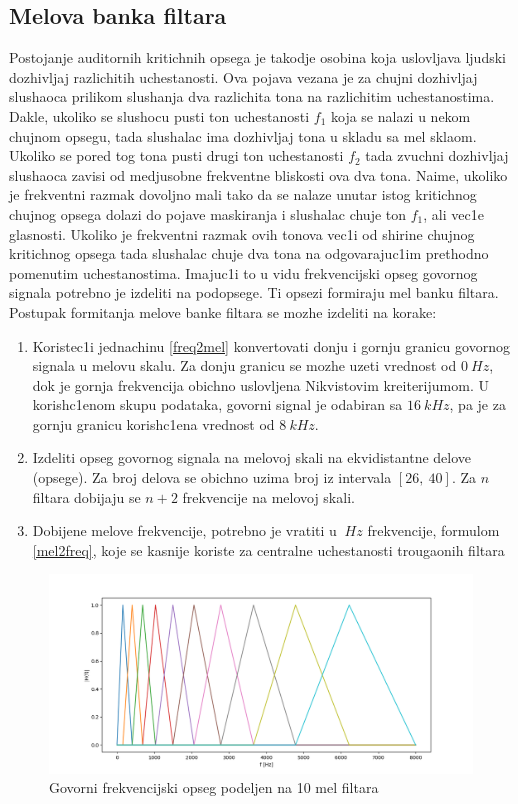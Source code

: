\documentclass[a4paper, openany, oneside, 11pt]{book}
\begin{document}
\subsection{Melova banka filtara}
Postojanje auditornih kritichnih opsega je takodje osobina koja uslovljava ljudski dozhivljaj razlichitih uchestanosti. Ova pojava vezana je za chujni dozhivljaj slushaoca  prilikom slushanja dva razlichita tona na razlichitim uchestanostima. Dakle, ukoliko se slushocu pusti ton uchestanosti $f_1$ koja se nalazi u nekom chujnom opsegu, tada slushalac ima dozhivljaj tona u skladu sa mel sklaom. Ukoliko se pored tog tona pusti drugi ton uchestanosti $f_2$ tada zvuchni dozhivljaj slushaoca zavisi od medjusobne frekventne bliskosti ova dva tona. Naime, ukoliko je frekventni razmak dovoljno mali tako da se nalaze unutar istog kritichnog chujnog opsega dolazi do pojave maskiranja i slushalac chuje ton $f_1$, ali vec1e glasnosti. Ukoliko je frekventni razmak ovih tonova vec1i od shirine chujnog kritichnog opsega tada slushalac chuje dva tona na odgovarajuc1im prethodno pomenutim uchestanostima. Imajuc1i to u vidu frekvencijski opseg govornog signala potrebno je izdeliti na podopsege. Ti opsezi formiraju mel banku filtara. Postupak formitanja melove banke filtara se mozhe izdeliti na korake:
\begin{enumerate}
\item Koristec1i jednachinu \ref{freq2mel} konvertovati donju i gornju granicu govornog signala u melovu skalu. Za donju granicu se mozhe uzeti vrednost od $\SI{0}{Hz}$, dok je gornja frekvencija obichno uslovljena Nikvistovim kreiterijumom. U korish\-c1enom skupu podataka, govorni signal je odabiran sa $\SI{16}{kHz}$, pa je za gornju granicu korish\-c1ena vrednost od $\SI{8}{kHz}$.
\item Izdeliti opseg govornog signala na melovoj skali na ekvidistantne delove (opsege). Za broj delova se obichno uzima broj iz intervala $[26,\ 40]$. Za $n$ filtara dobijaju se $n+2$ frekvencije na melovoj skali.
\item Dobijene melove frekvencije, potrebno je vratiti u $\SI{}{Hz}$ frekvencije, formulom \ref{mel2freq}, koje se kasnije koriste za centralne uchestanosti trougaonih filtara
\end{enumerate}
\begin{figure}[h!]
\centering
  \includegraphics[scale=0.5]{res/10filterbank.png}
  \caption{Govorni frekvencijski opseg podeljen na 10 mel filtara}
  \label{fig:2}
  \vspace{0pt}
\end{figure}
\end{document}
